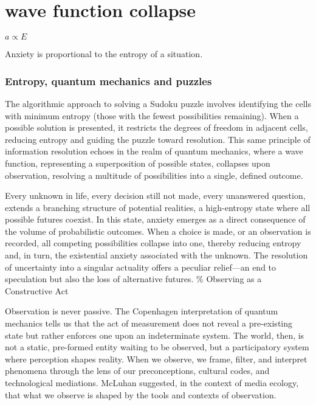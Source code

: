 \chapter*{wave function collapse}
\begin{center}
\vspace{2cm}
\begin{flushright}
\large
\textit{ $a \propto E$ }
\end{flushright}
\vspace{2cm}
\end{center}
\normalsize

Anxiety is proportional to the entropy of a situation. 

\newpage  %
\subsection*{ Entropy, quantum mechanics and puzzles} 

% 
The algorithmic approach to solving a Sudoku puzzle involves identifying the cells with minimum entropy (those with the fewest possibilities remaining). When a possible solution is presented, it restricts the degrees of freedom in adjacent cells, reducing entropy and guiding the puzzle toward resolution. This same principle of information resolution echoes in the realm of quantum mechanics, where a wave function, representing a superposition of possible states, collapses upon observation, resolving a multitude of possibilities into a single, defined outcome.

Every unknown in life, every decision still not made, every unanswered question, extends a branching structure of potential realities, a high-entropy state where all possible futures coexist. In this state, anxiety emerges as a direct consequence of the volume of probabilistic outcomes. When a choice is made, or an observation is recorded, all competing possibilities collapse into one, thereby reducing entropy and, in turn, the existential anxiety associated with the unknown. The resolution of uncertainty into a singular actuality offers a peculiar relief—an end to speculation but also the loss of alternative futures.
% 
{\scriptsize \textcolor{comment}{\%  Observing as a Constructive Act }}

Observation is never passive.  The Copenhagen interpretation of quantum mechanics tells us that the act of measurement does not reveal a pre-existing state but rather enforces one upon an indeterminate system. The world, then, is not a static, pre-formed entity waiting to be observed, but a participatory system where perception shapes reality. When we observe, we frame, filter, and interpret phenomena through the lens of our preconceptions, cultural codes, and technological mediations. McLuhan suggested, in the context of media ecology, that what we observe is shaped by the tools and contexts of observation. 

